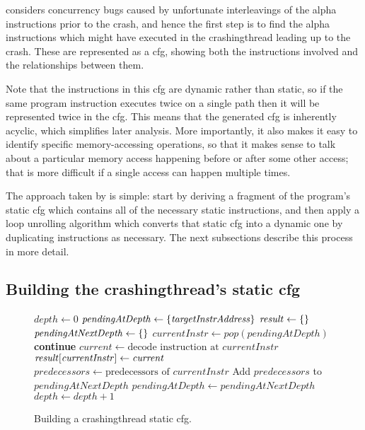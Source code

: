 {\Technique} considers concurrency bugs caused by unfortunate
interleavings of the \gls{alpha} instructions prior to the crash, and
hence the first step is to find the \gls{alpha} instructions which
might have executed in the \gls{crashingthread} leading up to the
crash.  These are represented as a \gls{cfg}, showing both the
instructions involved and the relationships between them.

Note that the instructions in this \gls{cfg} are dynamic rather than
static, so if the same program instruction executes twice on a single
path then it will be represented twice in the \gls{cfg}.  This means
that the generated \gls{cfg} is inherently acyclic, which simplifies
later analysis.  More importantly, it also makes it easy to identify
specific memory-accessing operations, so that it makes sense to talk
about a particular memory access happening before or after some other
access; that is more difficult if a single access can happen multiple
times.

The approach taken by {\technique} is simple: start by deriving a
fragment of the program's static \gls{cfg} which contains all of the
necessary static instructions, and then apply a loop unrolling
algorithm which converts that static \gls{cfg} into a dynamic one by
duplicating instructions as necessary.  The next subsections describe
this process in more detail.

\subsection[Building the \glsentrytext{crashingthread}'s static \glsentrytext{cfg}]{Building the \gls{crashingthread}'s static \gls{cfg}}
\label{sect:derive:build_static_cfg}

\begin{figure}
\begin{algorithmic}[1]
\State $\mathit{depth} \gets 0$
\State $\mathit{pendingAtDepth} \gets \{\mathit{targetInstrAddress}\}$
\State $\mathit{result} \gets \{\}$
  \State $\mathit{pendingAtNextDepth} \gets \{\}$
    \State $\mathit{currentInstr} \gets \mathit{pop}(\mathit{pendingAtDepth})$
      \State \textbf{continue}
    \EndIf
    \State $\mathit{current} \gets \text{decode instruction at } \mathit{currentInstr}$
    \State $\mathit{result}[\mathit{currentInstr}] \gets \mathit{current}$
    \State $\mathit{predecessors} \gets \text{predecessors of } \mathit{currentInstr}$
    \State Add $\mathit{predecessors}$ to $\mathit{pendingAtNextDepth}$
  \EndWhile
  \State $\mathit{pendingAtDepth} \gets \mathit{pendingAtNextDepth}$
  \State $\mathit{depth} \gets \mathit{depth} + 1$
\EndWhile
\end{algorithmic}
\vspace{-6pt}
\caption{Building a \gls{crashingthread} static \gls{cfg}.}
\label{fig:derive:static_read_cfg_single_function}
\end{figure}

